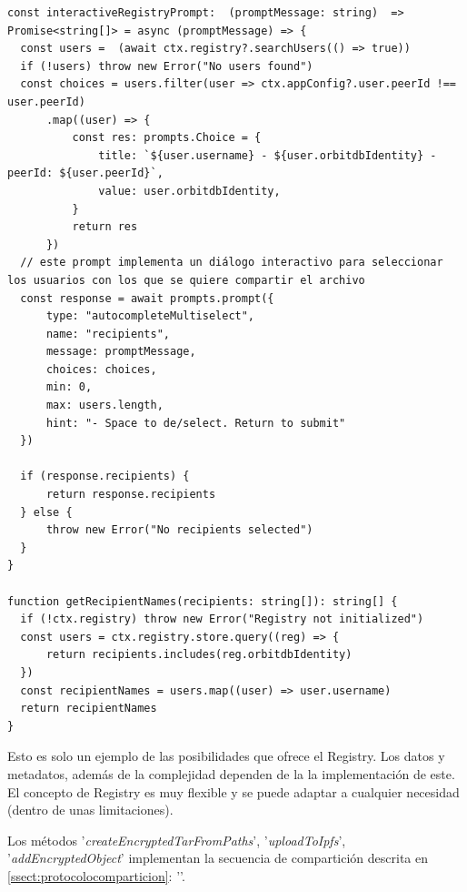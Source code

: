 \begin{verbatim}
const interactiveRegistryPrompt:  (promptMessage: string)  => Promise<string[]> = async (promptMessage) => {
  const users =  (await ctx.registry?.searchUsers(() => true))
  if (!users) throw new Error("No users found")
  const choices = users.filter(user => ctx.appConfig?.user.peerId !== user.peerId)
      .map((user) => {
          const res: prompts.Choice = {
              title: `${user.username} - ${user.orbitdbIdentity} - peerId: ${user.peerId}`,
              value: user.orbitdbIdentity,
          }
          return res
      })
  // este prompt implementa un diálogo interactivo para seleccionar los usuarios con los que se quiere compartir el archivo
  const response = await prompts.prompt({
      type: "autocompleteMultiselect",
      name: "recipients",
      message: promptMessage,
      choices: choices,
      min: 0,
      max: users.length,
      hint: "- Space to de/select. Return to submit"
  })

  if (response.recipients) {
      return response.recipients
  } else {
      throw new Error("No recipients selected")
  }
}

function getRecipientNames(recipients: string[]): string[] {
  if (!ctx.registry) throw new Error("Registry not initialized")
  const users = ctx.registry.store.query((reg) => {
      return recipients.includes(reg.orbitdbIdentity)
  })
  const recipientNames = users.map((user) => user.username)
  return recipientNames
}
\end{verbatim}

Esto es solo un ejemplo de las posibilidades que ofrece el Registry. Los datos y metadatos, además de la complejidad dependen de la la implementación
de este. El concepto de Registry es muy flexible y se puede adaptar a cualquier necesidad (dentro de unas limitaciones).

Los métodos
'\textit{createEncryptedTarFromPaths}',
'\textit{uploadToIpfs}',
'\textit{addEncryptedObject}' implementan la secuencia de compartición descrita en \ref{ssect:protocolocomparticion}: ''.

